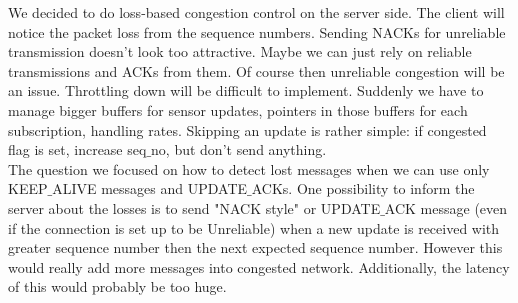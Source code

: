 \documentclass[11pt,a4paper]{report}
\begin{document}
We decided to do loss-based congestion control on the server side. The client will notice the packet loss from the sequence numbers. Sending NACKs for unreliable transmission doesn't look too attractive. Maybe we 
can just rely on reliable transmissions and ACKs from them. Of course then unreliable congestion will be an issue. Throttling down will be difficult to implement. Suddenly we have to manage bigger buffers for sensor updates, pointers in those buffers for each subscription, handling rates. Skipping an update is rather simple: if congested flag is set, increase seq$\_$no, but don't send anything. \\

The question we focused on how to detect lost messages when we can use only KEEP$\_$ALIVE messages and UPDATE$\_$ACKs. One possibility to inform the server about the losses is to send "NACK style" or UPDATE$\_$ACK message (even if the connection is set up to be Unreliable) when a new update is received with greater sequence number then the next expected sequence number. However this would really add more messages into congested network. Additionally, the latency of this would probably be too huge. 
\end{document}
